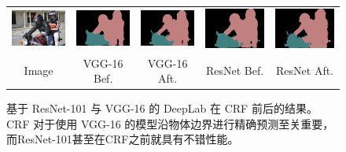 \begin{figure}[!t]
{\begin{tabular}{c @{\hskip 5pt} c @{\hskip 5pt} c @{\hskip 5pt} c @{\hskip 5pt} c}
    \includegraphics[width=0.21\linewidth]{fig/res_vs_vgg/resnet101_noup_pool3_14/img/2011_000455.jpg} &
    \includegraphics[width=0.21\linewidth]{fig/res_vs_vgg/vgg128_noup_pool3_20M_largewin3_newcode5/res_none/2011_000455.png} &
    \includegraphics[width=0.21\linewidth]{fig/res_vs_vgg/vgg128_noup_pool3_20M_largewin3_newcode5/res_crf/2011_000455.png} &
    \includegraphics[width=0.21\linewidth]{fig/res_vs_vgg/resnet101_noup_pool3_14/res_none/2011_000455.png} &
    \includegraphics[width=0.21\linewidth]{fig/res_vs_vgg/resnet101_noup_pool3_14/res_crf/2011_000455.png} \\

    {\scriptsize Image} &
    {\scriptsize VGG-16 Bef.} &
    {\scriptsize VGG-16 Aft.} &
    {\scriptsize ResNet Bef.} &
    {\scriptsize ResNet Aft.} \\
  \end{tabular}
  }
  \caption{基于 ResNet-101 与 VGG-16 的 DeepLab 在 CRF 前后的结果。CRF 对于使用 VGG-16 的模型沿物体边界进行精确预测至关重要，而ResNet-101甚至在CRF之前就具有不错性能。}
  \label{fig:res_vs_vgg_results}
\end{figure}

